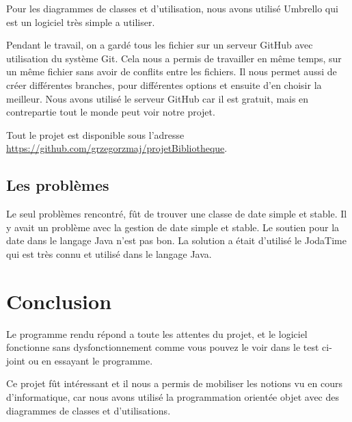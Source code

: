 \documentclass[10pt, a4paper]{article}
\begin{document}
		Pour les diagrammes de classes et d'utilisation, nous avons utilisé Umbrello qui est un logiciel 	
		très simple a utiliser.
		
		Pendant le travail, on a gardé tous les fichier sur un serveur GitHub avec utilisation du système 
		Git. Cela nous a permis de travailler en même temps, sur un même fichier sans avoir de conflits entre 
		les fichiers. Il nous permet aussi de créer différentes branches, pour différentes options et 
		ensuite d'en choisir la meilleur. Nous avons utilisé le serveur GitHub car il est gratuit, mais en 
		contrepartie tout le monde peut voir notre projet.
		
		Tout le projet est disponible sous l'adresse
		\url{https://github.com/grzegorzmaj/projetBibliotheque}.
		
		\subsection{Les problèmes}
		
		Le seul problèmes rencontré, fût de trouver une classe de date simple et stable. Il y avait un problème avec la gestion de 
		date simple et stable. Le soutien pour la date dans le langage Java n'est pas bon. La solution a était d'utilisé le JodaTime 
		qui est très connu et utilisé dans le langage Java.
		
		\section{Conclusion}
		
		Le programme rendu répond a toute les attentes du projet, et le logiciel fonctionne sans dysfonctionnement comme vous pouvez
		le voir dans le test ci-joint ou en essayant le programme.
		
		\bigbreak
		
		Ce projet fût intéressant et il nous a permis de mobiliser les notions vu en cours d'informatique, car nous avons utilisé la 
		programmation	orientée objet avec des diagrammes de classes et d'utilisations.
\end{document}
